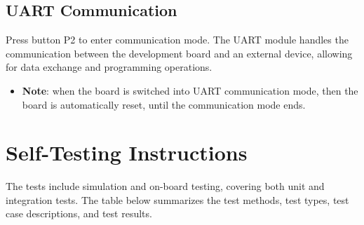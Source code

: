 \documentclass[a4paper,12pt]{article}
\begin{document}
\subsection{UART Communication}

Press button P2 to enter communication mode. The UART module handles the communication between the development board and an external device, allowing for data exchange and programming operations. 

\begin{itemize}
    \item \textbf{Note}: when the board is switched into UART communication mode, then the board is automatically reset, until the communication mode ends. 
\end{itemize}


\section{Self-Testing Instructions}

The tests include simulation and on-board testing, covering both unit and integration tests. The table below summarizes the test methods, test types, test case descriptions, and test results.
\end{document}

